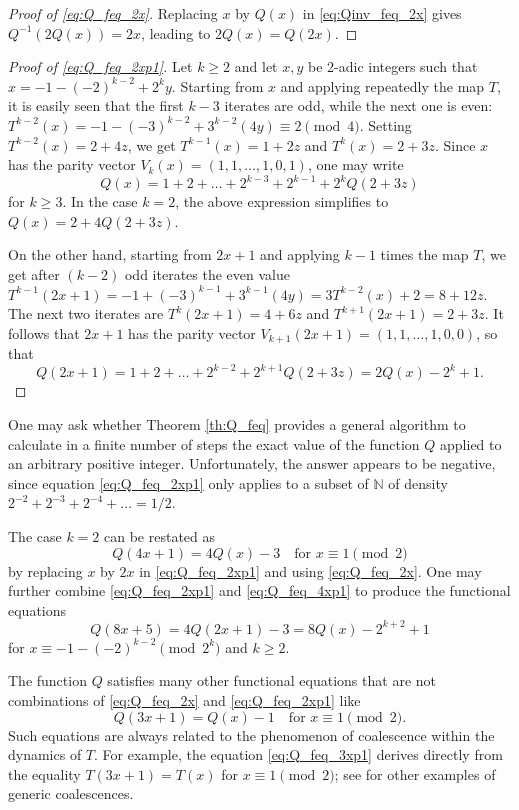 \documentclass[12pt]{article}
\theoremstyle{definition}
\begin{document}
\begin{proof}[Proof of \eqref{eq:Q_feq_2x}]
Replacing $x$ by $Q(x)$ in \eqref{eq:Qinv_feq_2x} gives $Q^{-1}(2 Q(x)) = 2 x$, leading to $2Q(x) = Q(2x)$.
\end{proof}

\begin{proof}[Proof of \eqref{eq:Q_feq_2xp1}]
Let $k \geq 2$ and let $x,y$ be 2-adic integers such that $x = -1 - (-2)^{k-2} +2^{k}y$. 
Starting from $x$ and applying repeatedly the map $T$, it is easily seen that the first $k-3$ iterates are odd, while the next one is even: $T^{k-2}(x) = -1 - (-3)^{k-2} + 3^{k-2} (4y) \equiv 2 \pmod{4}$. Setting $T^{k-2}(x) = 2+4z$, we get $T^{k-1}(x) = 1+2z$ and $T^{k}(x) = 2+3z$. Since $x$ has the parity vector $V_k(x) = (1, 1, \ldots, 1, 0, 1)$, one may write 
$$ Q(x) = 1 + 2 + \ldots + 2^{k-3} + 2^{k-1} + 2^{k} Q( 2+3z ) $$
for $k \geq 3$. In the case $k=2$, the above expression simplifies to $Q(x) = 2 + 4Q(2+3z) $.

On the other hand, starting from $2x+1$ and applying $k-1$ times the map $T$, we get after $(k-2)$ odd iterates the even value $T^{k-1}(2x+1) = -1 + (-3)^{k-1} + 3^{k-1} (4y) = 3T^{k-2}(x) +2 = 8+12z$. The next two iterates are $T^{k}(2x+1) = 4+6z$ and $T^{k+1}(2x+1) = 2+3z$.  It follows that $2x+1$ has the parity vector $V_{k+1}(2x+1) = (1, 1, \ldots, 1, 0, 0)$, so that 
$$ Q(2x+1) = 1 + 2 + \ldots + 2^{k-2} + 2^{k+1} Q(2+3z)  = 2Q(x) -2^{k} + 1.$$
\end{proof}

One may ask whether Theorem \ref{th:Q_feq} provides a general algorithm to calculate in a finite number of steps the exact value of the function $Q$ applied to an arbitrary positive integer. Unfortunately, the answer appears to be negative, since equation \eqref{eq:Q_feq_2xp1} only applies to a subset of $\mathbb N$ of density $2^{-2}+2^{-3}+2^{-4}+\ldots = 1/2$.

The case $k=2$  can be restated as
\begin{equation}
Q(4 x + 1) = 4 Q(x) - 3  \quad \text{for }x \equiv 1  \pmod{2} \label{eq:Q_feq_4xp1} 
\end{equation}
by replacing $x$ by $2x$ in \eqref{eq:Q_feq_2xp1} and using \eqref{eq:Q_feq_2x}. One may further combine \eqref{eq:Q_feq_2xp1} and \eqref{eq:Q_feq_4xp1} to produce the functional equations
$$ Q(8x+5) = 4Q(2x+1) - 3 = 8Q(x) - 2^{k+2} + 1 $$
for $x \equiv -1 - (-2)^{k-2}  \pmod{2^{k}}$ and $k \geq 2$.

The function $Q$ satisfies many other functional equations that are not combinations of \eqref{eq:Q_feq_2x} and \eqref{eq:Q_feq_2xp1} like
\begin{equation} \label{eq:Q_feq_3xp1}
Q(3x+1) = Q(x) - 1\quad \text{for }x \equiv 1  \pmod{2}. 
\end{equation}
Such equations are always related to the phenomenon of coalescence within the dynamics of $T$. For example, the equation \eqref{eq:Q_feq_3xp1} derives directly from the equality $T(3x+1) = T(x)$ for $x \equiv 1 \pmod{2}$; see \cite{And00,Gar85} for other examples of generic coalescences.
\end{document}
